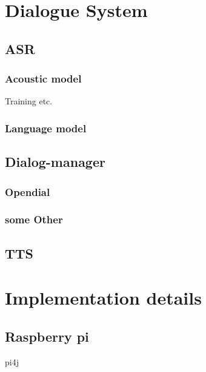 \documentclass[a4paper, 12pt]{article}
\begin{document}


\pagestyle{empty}

\pagestyle{plain}
\setcounter{page}{1}


\section{Dialogue System}

\subsection{ASR}

\subsubsection{Acoustic model}
Training etc.

\subsubsection{Language model}

%

\subsection{Dialog-manager}

\subsubsection{Opendial}
\label{sec:opendial}

\subsubsection{some Other}

\subsection{TTS}

\section{Implementation details}
\subsection{Raspberry pi}
pi4j
\end{document}
